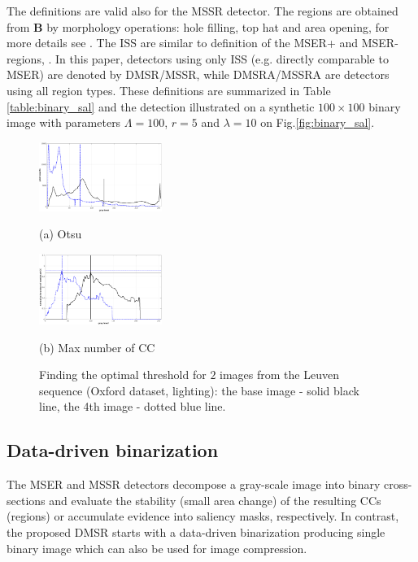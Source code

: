 \documentclass{article}
\def\B{{\mathbf B}}
\begin{document}
The definitions are valid also for the MSSR detector. The regions are obtained from $\B$ by morphology operations: hole filling, top hat and area opening, for more details see \cite{RangMSSR06, RangHumpb06}. The ISS are similar to definition of the MSER+ and MSER- regions, \cite{Matas2002BMVC}. In this paper, detectors using only ISS (e.g. directly comparable to MSER) are denoted by DMSR/MSSR, while DMSRA/MSSRA are detectors using all region types. These definitions are summarized in Table \ref{table:binary_sal} and the detection illustrated on a synthetic $100 \times 100$ binary image with parameters $\Lambda=100$, $r=5$ and $\lambda = 10$ on Fig.\ref{fig:binary_sal}.


\begin{figure}[htb]

\begin{minipage}[b]{.49\linewidth}
  \centering
  \centerline{\includegraphics[width=4.0cm]{./Figs/hist_otsu_leuven_1_4}}
  \centerline{(a) Otsu}\medskip
\end{minipage}
\hfill
\begin{minipage}[b]{0.49\linewidth}
  \centering
  \centerline{\includegraphics[width=4.0cm]{./Figs/hist_numcc_leuven_1_4}}
  \centerline{(b) Max number of CC}\medskip
\end{minipage}
\vspace{-0.25cm}
\caption{Finding the optimal threshold for $2$ images from the Leuven sequence 
(Oxford dataset, lighting): 
the base image - solid black line, the 4th image - dotted blue line.}
\label{fig:binary_hist}
%
\end{figure}

\subsection{Data-driven binarization}
\label{ssec:binarize}
The MSER and MSSR detectors decompose a gray-scale image into binary cross-sections and evaluate the stability (small area change) of the resulting CCs (regions) or accumulate evidence into saliency masks, respectively. In contrast, the proposed DMSR starts with a data-driven binarization producing single binary image which can also be used for image compression. 
\end{document}
